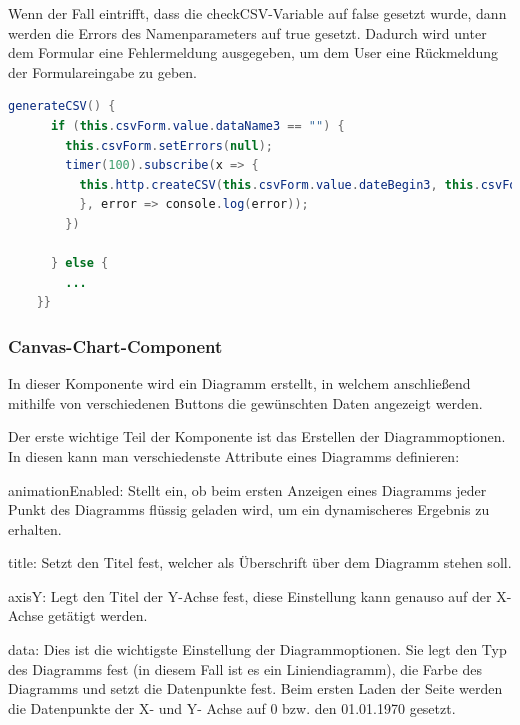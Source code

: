 Wenn der Fall eintrifft, dass die checkCSV-Variable auf false gesetzt wurde, dann werden die Errors des Namenparameters auf true gesetzt. Dadurch wird unter dem Formular eine Fehlermeldung ausgegeben, um dem User eine Rückmeldung der Formulareingabe zu geben.
 
\begin{lstlisting}[language=java,caption=CSV-File generieren,label=lst:impl:generateCSV]
    generateCSV() {
      if (this.csvForm.value.dataName3 == "") {
        this.csvForm.setErrors(null);
        timer(100).subscribe(x => {
          this.http.createCSV(this.csvForm.value.dateBegin3, this.csvForm.value.dateEnd3, this.csvForm.value.timeBegin3, this.csvForm.value.timeEnd3, "C:/angular1/monitor.csv").subscribe(value => { window.open("http://localhost:8081/logEntry/download/");
          }, error => console.log(error));
        })

      } else {
        ...
    }}
\end{lstlisting}


\subsubsection{Canvas-Chart-Component}
 
In dieser Komponente wird ein Diagramm erstellt, in welchem anschließend mithilfe von verschiedenen Buttons die gewünschten Daten angezeigt werden. 
 
Der erste wichtige Teil der Komponente ist das Erstellen der Diagrammoptionen. In diesen kann man verschiedenste Attribute eines Diagramms definieren:
 
\begin{compactitem}
    \item animationEnabled: Stellt ein, ob beim ersten Anzeigen eines Diagramms jeder Punkt des Diagramms flüssig geladen wird, um ein dynamischeres Ergebnis zu erhalten.   
    \item title: Setzt den Titel fest, welcher als Überschrift über dem Diagramm stehen soll.         
    \item axisY: Legt den Titel der Y-Achse fest, diese Einstellung kann genauso auf der X-Achse getätigt werden.   
    \item data: Dies ist die wichtigste Einstellung der Diagrammoptionen. Sie legt den Typ des Diagramms fest (in diesem Fall ist es ein Liniendiagramm), die Farbe des Diagramms und setzt die Datenpunkte fest. Beim ersten Laden der Seite werden die Datenpunkte der X- und Y- Achse auf 0 bzw. den 01.01.1970 gesetzt.
\end{compactitem}
 
